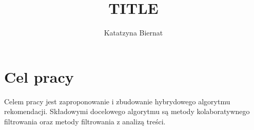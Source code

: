 \documentclass[twoside]{iisthesis}
\newcommand{\myfigure}[1]{%
\addcontentsline{figu}{myfigure}{\protect\numberline{\thefigure}#1}\par}
\begin{document}
\newcommand{\resultChart}[7][140]{
\def\dataS{{#2}}
	\begin{figure}[H]
	
\centering

\begin{center}
\begin{tikzpicture}
 
\begin{axis}[
ybar,
bar width=20,
legend style={at={(0.5,-0.25)},
anchor=north,legend columns=-1},
ylabel={Wartość miary},
symbolic x coords={\dataS},
xtick=data,
height=  {#1},
width=0.8\textwidth,
ymin=0, ytick={0,0.5,1},
ymax=1.5,
nodes near coords,
nodes near coords align={vertical},
]
\addplot coordinates { (\dataS,{#3}) };
\addplot coordinates {(\dataS,{#4}) };
\addplot coordinates { (\dataS,{#5}) };
\legend{Recall,Precission,F1-Score}
\end{axis}
\end{tikzpicture}
\end{center}
\caption{{#6}}
\myfigure{{#6}}
\label{{#7}}
\end{figure}
}


%
\nocite{*}
\title{ TITLE }
\author{Katatzyna Biernat }

\date{\number\the\year}




\maketitle
\textpages


\graphicspath{ {img/} }

  \listoftodos

 \chapter{Cel pracy}
	Celem pracy jest zaproponowanie i zbudowanie hybrydowego algorytmu rekomendacji. Składowymi docelowego algorytmu są metody kolaboratywnego filtrowania oraz metody filtrowania z analizą treści.  
 
\end{document}
